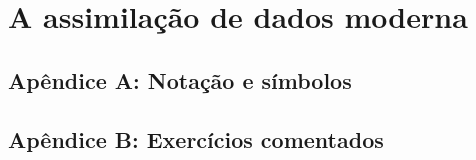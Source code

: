 \documentclass[12pt,a4paper,oneside]{book}
\begin{document}

\part{A assimilação de dados moderna}


\backmatter

\printglossary[type=\acronymtype,title={Lista de Siglas}]
\printglossary[title={Glossário}]

\printbibliography[title={Referências}]

\printindex

\appendix
\chapter{Apêndice A: Notação e símbolos}
\chapter{Apêndice B: Exercícios comentados}
\end{document}
